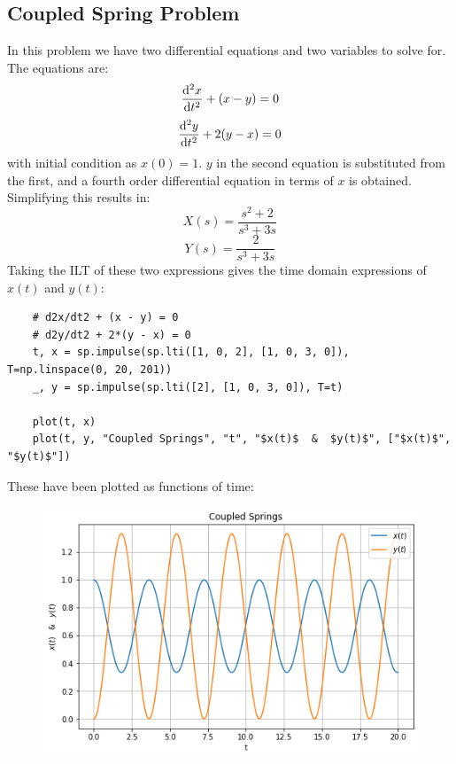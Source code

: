 \documentclass[12pt, a4paper]{article}
\begin{document}
\subsection{Coupled Spring Problem}
In this problem we have two differential equations and two variables to solve for.
The equations are:
\[\dv[2]{x}{t} +(x-y) = 0 \]
\[\dv[2]{y}{t} +2(y-x) = 0 \]
with initial condition as $x(0) = 1$. $y$ in the second equation is substituted from the first,
and a fourth order differential equation in terms of $x$ is obtained.
Simplifying this results in:
\[X(s) = \frac{s^2+2}{s^3+3s} \]
\[Y(s) =  \frac{2}{s^3+3s} \]
Taking the ILT of these two expressions gives the time domain expressions of $x(t)$ and $y(t)$:
\begin{lstlisting}
    # d2x/dt2 + (x - y) = 0
    # d2y/dt2 + 2*(y - x) = 0
    t, x = sp.impulse(sp.lti([1, 0, 2], [1, 0, 3, 0]), T=np.linspace(0, 20, 201))
    _, y = sp.impulse(sp.lti([2], [1, 0, 3, 0]), T=t)

    plot(t, x)
    plot(t, y, "Coupled Springs", "t", "$x(t)$  &  $y(t)$", ["$x(t)$", "$y(t)$"])
\end{lstlisting}
These have been plotted as functions of time:
\begin{figure}[H]
    \centering
    \includegraphics[scale=0.6]{4.png}
\end{figure}
\end{document}
